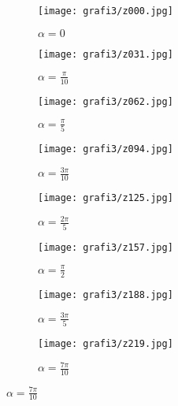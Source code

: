 \documentclass[12pt, a4paper]{article}
\begin{document}

\begin{figure}[h]
  \centering
  \begin{subfigure}[b]{0.49\textwidth}
    \centering
    \texttt{[image: grafi3/z000.jpg]}
    \caption{$\alpha = 0$}
    \label{graf}
  \end{subfigure}
  \begin{subfigure}[b]{0.49\textwidth}
    \centering
    \texttt{[image: grafi3/z031.jpg]}
    \caption{$\alpha = \frac{\pi}{10}$}
    \label{graf}
  \end{subfigure}
  \begin{subfigure}[b]{0.49\textwidth}
    \centering
    \texttt{[image: grafi3/z062.jpg]}
    \caption{$\alpha = \frac{\pi}{5}$}
    \label{graf}
  \end{subfigure}
  \begin{subfigure}[b]{0.49\textwidth}
    \centering
    \texttt{[image: grafi3/z094.jpg]}
    \caption{$\alpha = \frac{3\pi}{10}$}
    \label{graf}
  \end{subfigure}
  \begin{subfigure}[b]{0.49\textwidth}
    \centering
    \texttt{[image: grafi3/z125.jpg]}
    \caption{$\alpha = \frac{2\pi}{5}$}
    \label{graf}
  \end{subfigure}
  \begin{subfigure}[b]{0.49\textwidth}
    \centering
    \texttt{[image: grafi3/z157.jpg]}
    \caption{$\alpha = \frac{\pi}{2}$}
    \label{graf}
  \end{subfigure}
  \begin{subfigure}[b]{0.49\textwidth}
    \centering
    \texttt{[image: grafi3/z188.jpg]}
    \caption{$\alpha = \frac{3\pi}{5}$}
    \label{graf}
  \end{subfigure}
  \begin{subfigure}[b]{0.49\textwidth}
    \centering
    \texttt{[image: grafi3/z219.jpg]}
    \caption{$\alpha = \frac{7\pi}{10}$}
    \label{graf}
  \end{subfigure}
\end{figure}
\end{document}
